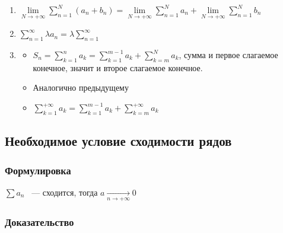 \documentclass{article}
\begin{document}
                \begin{enumerate}
                
                    \item $\lim\limits_{N \rightarrow +\infty} \sum\limits^N_{n = 1} (a_n + b_n) = \lim\limits_{N \rightarrow +\infty} \sum\limits^N_{n = 1} a_n + \lim\limits_{N \rightarrow +\infty} \sum\limits^N_{n = 1} b_n$
                    
                    \item $\sum\limits^{\infty}_{n = 1} \lambda a_n = \lambda \sum\limits^{\infty}_{n = 1}$
                    
                    \item
                    
                        \begin{itemize}
                        
                            \item $S_n = \sum\limits^n_{k = 1} a_k = \sum\limits^{m - 1}_{k = 1} a_k + \sum\limits_{k = m}^N a_k$, сумма и первое слагаемое конечное, значит и второе слагаемое конечное.
                            
                            \item Аналогично предыдущему
                            
                            \item $\sum\limits^{+\infty}_{k = 1} a_k = \sum\limits^{m - 1}_{k = 1} a_k + \sum\limits^{+\infty}_{k = m} a_k$
                            
                        \end{itemize}
                        
                \end{enumerate}
        
        \subsection{Необходимое условие сходимости рядов}
        
            \subsubsection{Формулировка}
            
                $\sum a_n$ ~--- сходится, тогда $a \xrightarrow[n \rightarrow +\infty]{} 0$
                
            \subsubsection{Доказательство}
            
\end{document}
